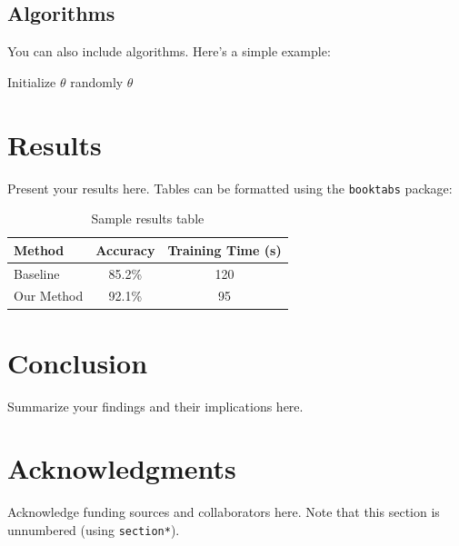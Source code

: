 \documentclass[pmlr]{jmlr} %
\begin{document}
\subsection{Algorithms}

You can also include algorithms. Here's a simple example:

\begin{algorithm}[htbp]
  \SetAlgoLined
  Initialize $\theta$ randomly\;
  \Return $\theta$\;
  \caption{Sample gradient descent algorithm}
  \label{alg:sample}
\end{algorithm}

\section{Results}

Present your results here. Tables can be formatted using the
\texttt{booktabs} package:

\begin{table}[htbp]
  \centering
  \caption{Sample results table}
  \label{tab:results}
  \begin{tabular}{lcc}
    \toprule
    Method & Accuracy & Training Time (s) \\
    \midrule
    Baseline & 85.2\% & 120 \\
    Our Method & 92.1\% & 95 \\
    \bottomrule
  \end{tabular}
\end{table}

\section{Conclusion}

Summarize your findings and their implications here.

\section*{Acknowledgments}

Acknowledge funding sources and collaborators here. Note that this
section is unnumbered (using \texttt{section*}).

\end{document}
